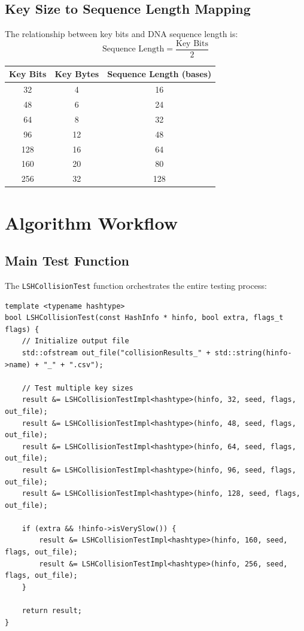 \documentclass[11pt,a4paper]{article}
\begin{document}
\subsection{Key Size to Sequence Length Mapping}

The relationship between key bits and DNA sequence length is:
\begin{equation}
\text{Sequence Length} = \frac{\text{Key Bits}}{2}
\end{equation}

\begin{center}
\begin{tabular}{|c|c|c|}
\hline
\textbf{Key Bits} & \textbf{Key Bytes} & \textbf{Sequence Length (bases)} \\
\hline
32 & 4 & 16 \\
48 & 6 & 24 \\
64 & 8 & 32 \\
96 & 12 & 48 \\
128 & 16 & 64 \\
160 & 20 & 80 \\
256 & 32 & 128 \\
\hline
\end{tabular}
\end{center}

\section{Algorithm Workflow}

\subsection{Main Test Function}

The \texttt{LSHCollisionTest} function orchestrates the entire testing process:

\begin{lstlisting}[caption=Main Test Function Structure]
template <typename hashtype>
bool LSHCollisionTest(const HashInfo * hinfo, bool extra, flags_t flags) {
    // Initialize output file
    std::ofstream out_file("collisionResults_" + std::string(hinfo->name) + "_" + ".csv");
    
    // Test multiple key sizes
    result &= LSHCollisionTestImpl<hashtype>(hinfo, 32, seed, flags, out_file);
    result &= LSHCollisionTestImpl<hashtype>(hinfo, 48, seed, flags, out_file);
    result &= LSHCollisionTestImpl<hashtype>(hinfo, 64, seed, flags, out_file);
    result &= LSHCollisionTestImpl<hashtype>(hinfo, 96, seed, flags, out_file);
    result &= LSHCollisionTestImpl<hashtype>(hinfo, 128, seed, flags, out_file);
    
    if (extra && !hinfo->isVerySlow()) {
        result &= LSHCollisionTestImpl<hashtype>(hinfo, 160, seed, flags, out_file);
        result &= LSHCollisionTestImpl<hashtype>(hinfo, 256, seed, flags, out_file);
    }
    
    return result;
}
\end{lstlisting}
\end{document}
